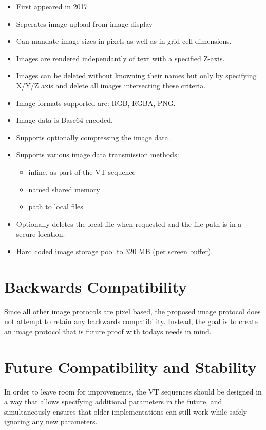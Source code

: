 \documentclass{article}
\begin{document}
\begin{itemize}
    \item First appeared in 2017
    \item Seperates image upload from image display
    \item Can mandate image sizes in pixels as well as in grid cell dimensions.
    \item Images are rendered independantly of text with a specified Z-axis.
    \item Images can be deleted without knowning their names but only by specifying X/Y/Z axis
          and delete all images intersecting these criteria.
    \item Image formats supported are: RGB, RGBA, PNG.
    \item Image data is Base64 encoded.
    \item Supports optionally compressing the image data.
    \item Supports various image data transmission methods:
        \begin{itemize}
            \item inline, as part of the VT sequence
            \item named shared memory
            \item path to local files
        \end{itemize}
    \item Optionally deletes the local file when requested and the file path is in a secure location.
    \item Hard coded image storage pool to 320 MB (per screen buffer).
\end{itemize}

\section{Backwards Compatibility} %

Since all other image protocols are pixel based, the proposed image protocol does not
attempt to retain any backwards compatibility. Instead, the goal is to create
an image protocol that is future proof with todays needs in mind.

\section{Future Compatibility and Stability} %

In order to leave room for improvements, the VT sequences should be designed in a way
that allows specifying additional parameters in the future, and simultaneously ensures
that older implementations can still work while safely ignoring any new parameters.
\end{document}
